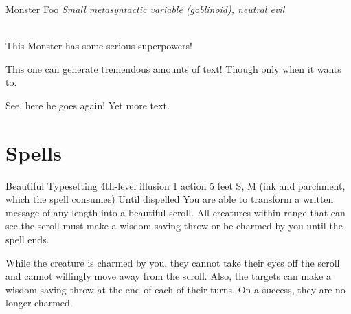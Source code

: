 \documentclass[10pt,twoside,twocolumn,openany]{book}
\begin{document}
\begin{monsterbox}{Monster Foo}
	\textit{Small metasyntactic variable (goblinoid), neutral evil}\\
	\hline
	\basics[%
	armorclass = 12,
	hitpoints  = \dice{3d8 + 3},
	speed      = 50 ft
	]
	\hline
	\stats[
    STR = \stat{12}, %
    DEX = \stat{7}
	]
	\hline
	\details[%
	languages = {Common Lisp, Erlang},
	]
	\hline \\[1mm]
	\begin{monsteraction}
		This Monster has some serious superpowers!
	\end{monsteraction}
	\begin{monsteraction}
		This one can generate tremendous amounts of text! Though only when it wants to.
	\end{monsteraction}

	\begin{monsteraction}
    See, here he goes again! Yet more text.
	\end{monsteraction}
\end{monsterbox}

\section{Spells}

\begin{spell}
	{Beautiful Typesetting}
	{4th-level illusion}
	{1 action}
	{5 feet}
	{S, M (ink and parchment, which the spell consumes)}
	{Until dispelled}
	You are able to transform a written message of any length into a beautiful scroll. All creatures within range that can see the scroll must make a wisdom saving throw or be charmed by you until the spell ends.

	While the creature is charmed by you, they cannot take their eyes off the scroll and cannot willingly move away from the scroll. Also, the targets can make a wisdom saving throw at the end of each of their turns. On a success, they are no longer charmed.
\end{spell}

\lipsum[1-2]

\end{document}
